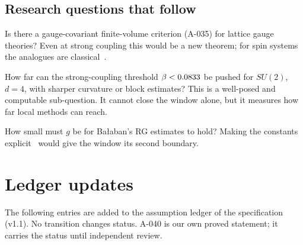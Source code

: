 \documentclass[11pt,a4paper]{article}
\newcommand{\idref}[1]{\textsf{#1}}
\begin{document}
\subsection{Research questions that follow}
\begin{description}[font=\normalfont\bfseries,leftmargin=1.2cm,labelwidth=1cm,align=left]
\item[RQ1] Is there a gauge-covariant finite-volume criterion (\idref{A-035}) for lattice gauge theories? Even at strong coupling this would be a new theorem; for spin systems the analogues are classical~\cite{DS87,MO94,SZ92}.
\item[RQ2] How far can the strong-coupling threshold $\beta<0.0833$ be pushed for $SU(2)$, $d=4$, with sharper curvature or block estimates? This is a well-posed and computable sub-question. It cannot close the window alone, but it measures how far local methods can reach.
\item[RQ3] How small must $g$ be for Ba{\l}aban's RG estimates to hold? Making the constants explicit~\cite{Dim13a,Dim13b} would give the window its second boundary.
\end{description}

\section{Ledger updates}\label{sec:ledger}
The following entries are added to the assumption ledger of the specification (v1.1). No transition changes status. \idref{A-040} is our own proved statement; it carries the status  until independent review.
\end{document}
